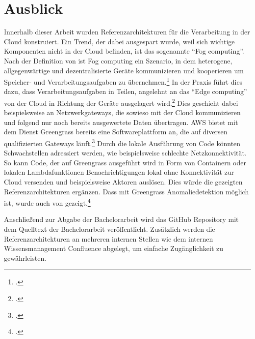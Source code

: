\section{Ausblick}
Innerhalb dieser Arbeit wurden Referenzarchitekturen für die Verarbeitung in der Cloud konstruiert. Ein Trend, der dabei ausgespart wurde, weil sich wichtige Komponenten nicht in der Cloud befinden, ist das sogenannte \enquote{Fog computing}. Nach der Definition von \citeauthor{Vaquero.2014} ist Fog computing ein Szenario, in dem heterogene, allgegenwärtige und dezentralisierte Geräte kommunizieren und kooperieren um Speicher- und Verarbeitungsaufgaben zu übernehmen.\footcite[Vgl.][30\psq]{Vaquero.2014} In der Praxis führt dies dazu, dass Verarbeitungsaufgaben in Teilen, angelehnt an das \enquote{Edge computing} von der Cloud in Richtung der Geräte ausgelagert wird.\footcite[Vgl.][]{Bonomi.2012} Dies geschieht dabei beispielsweise an Netzwerkgateways, die sowieso mit der Cloud kommunizieren und folgend nur noch bereits ausgewertete Daten übertragen. \ac{AWS} bietet mit dem Dienst Greengrass bereits eine Softwareplattform an, die auf diversen qualifizierten Gateways läuft.\footcite[Vgl. auch im Folgenden][]{AmazonWebServicesInc..o.J.bu} Durch die lokale Ausführung von Code könnten Schwachstellen adressiert werden, wie beispielsweise schlechte Netzkonnektivität. So kann Code, der auf Greengrass ausgeführt wird in Form von Containern oder lokalen Lambdafunktionen Benachrichtigungen lokal ohne Konnektivität zur Cloud versenden und beispielsweise Aktoren auslösen. Dies würde die gezeigten Referenzarchitekturen ergänzen. Dass mit Greengrass Anomaliedetektion möglich ist, wurde auch von \citeauthor{Shankar.2020} gezeigt.\footcite[Vgl.][]{Shankar.2020}

Anschließend zur Abgabe der Bachelorarbeit wird das GitHub Repository mit dem Quelltext der Bachelorarbeit veröffentlicht. Zusätzlich werden die Referenzarchitekturen an mehreren internen Stellen wie dem internen Wissensmanagement Confluence abgelegt, um einfache Zugänglichkeit zu gewährleisten.